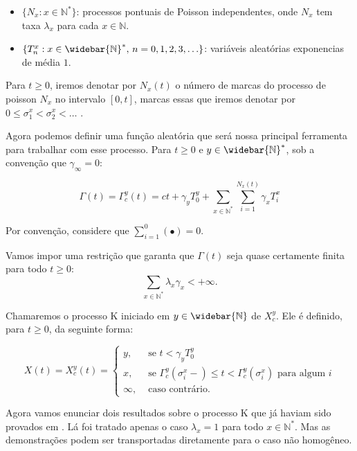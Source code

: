 \documentclass[11pt,twoside,a4paper]{article}
\newcommand{\N}{{\mathbb{N}}}
\newcommand{\Nb}{{\widebar{\N}}}
\newcommand{\Nz}{{\mathbb{N^*}}}
\newcommand{\Nzb}{{\mathbb{\widebar{N}^*}}}
\begin{document}
\begin{itemize}
\item $\{ N_x: x \in \Nz \}$: processos pontuais de Poisson
  independentes, onde $N_x$ tem taxa $\lambda_x$ para cada $x \in \N$.
\item $\{T_n^x: x \in \Nzb , \, n = 0, 1, 2, 3, \ldots \}$: variáveis
  aleatórias exponencias de média $1$.
\end{itemize}

Para $t \geq 0$, iremos denotar por $N_x(t)$ o número de marcas do
processo de poisson $N_x$ no intervalo $[0, t]$, marcas essas que
iremos denotar por $0 \leq \sigma_1^x < \sigma_2^x < \ldots$ .

Agora podemos definir uma função aleatória que será nossa principal
ferramenta para trabalhar com esse processo. Para $t \geq 0$ e $y \in
\Nzb$, sob a convenção que $\gamma_\infty = 0$:

\begin{equation}
  \label{def:Gamma}
  \Gamma(t) = \Gamma^y_c (t) =
  ct +
  \gamma_y T_0^y +
  \sum_{x \in \Nz} \sum_{i = 1}^{N_x(t)}
  \gamma_x T_i^x
\end{equation}

Por convenção, considere que $\sum_{i=1}^{0}( \bullet ) = 0$.

Vamos impor uma restrição que garanta que $\Gamma(t)$ seja quase
certamente finita para todo $t \geq 0$:
\begin{equation}
  \sum_{x \in \Nz} \lambda_x\gamma_x < +\infty.
\end{equation}

Chamaremos o processo K iniciado em $y \in \Nb$ de $X^y_c$. Ele é
definido, para $t \geq 0$, da seguinte forma:

\begin{equation}
  \label{def:procK}
  X(t) = X^y_c (t) =
  \begin{cases}
    y, & \textrm{ se }  t < \gamma_y T_0^y\\
    x, & \textrm{ se } \Gamma^y_c(\sigma_i^x-) \leq t <
    \Gamma^y_c(\sigma^x_i)
    \textrm{ para algum } i \\
    \infty, & \textrm{ caso contrário.}
  \end{cases}
\end{equation}


Agora vamos enunciar dois resultados sobre o processo K que já haviam
sido provados em \cite{fontes:08}. Lá foi tratado apenas o caso
$\lambda_x = 1$ para todo $x \in \Nz$. Mas as demonstrações podem ser
transportadas diretamente para o caso não homogêneo.
\end{document}
